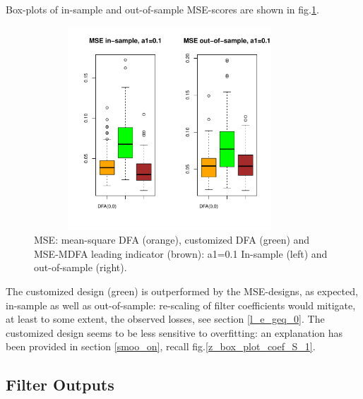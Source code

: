\documentclass[a4paper]{book}
\begin{document}
Box-plots of in-sample and out-of-sample MSE-scores are shown in fig.\ref{z_MSE_dfacust_leadind}.
\begin{figure}[H]\begin{center}\includegraphics[height=3in, width=4in]{z_MSE_dfacust_leadind}\caption{MSE: mean-square DFA (orange), customized DFA (green) and MSE-MDFA leading indicator (brown): a1=0.1 In-sample (left) and out-of-sample (right).\label{z_MSE_dfacust_leadind}}\end{center}\end{figure}The customized design (green) is outperformed by the MSE-designs, as expected, in-sample as well as out-of-sample: re-scaling of filter coefficients would mitigate, at least to some extent, the observed losses, see section \ref{l_e_geq_0}. The customized design seems to be less sensitive to overfitting: an explanation has been provided in section \ref{smoo_on}, recall fig.\ref{z_box_plot_coef_S_1}. 





\subsection{Filter Outputs}
\end{document}
